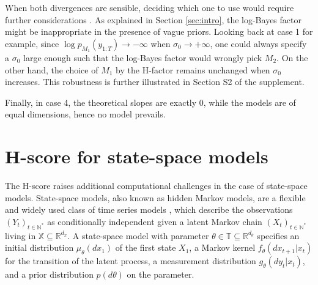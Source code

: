 \documentclass[12pt]{article}
\theoremstyle{plain}
\theoremstyle{definition}
\newcommand{\supphscoreiidNormalrobust}{ S2 }
\begin{document}
	When both divergences are sensible, deciding which one to use would require further considerations \citep[e.g.\! see][]{jewson2018principled}. As explained in Section \ref{sec:intro}, the log-Bayes factor might be inappropriate in the presence of vague priors. Looking back at case 1 for example, since $\log p_{M_1}(y_{1:T})\to -\infty$ when
	$\sigma_0 \to +\infty$, one could always specify a $\sigma_0$ large enough such that the log-Bayes factor would wrongly pick $M_2$. On the other hand, the choice of $M_1$ by the H-factor remains unchanged when $\sigma_0$ increases. This robustness is further illustrated in Section\supphscoreiidNormalrobust of the supplement.
	
	Finally, in case 4, the theoretical slopes are exactly 0, while the models are
	of equal dimensions, hence no model prevails.
	\section{H-score for state-space models}
	\label{sec:hscore_SSM}
	The H-score raises additional computational challenges in the case of state-space models.
	State-space models, also known as hidden Markov models, are a flexible and widely used class of
	time series models \citep{cappe2005,douc:moulines:stoffer2014}, which describe the
	observations $(Y_t)_{t\in\mathbb{N}^*}$ as conditionally
	independent given a latent Markov chain $(X_t)_{t\in\mathbb{N}^*}$ living in $\mathbb{X}\subseteq\mathbb{R}^{d_x}$. A 
	state-space model with parameter
	$\theta\in\mathbb{T}\subseteq\mathbb{R}^{d_\theta}$ specifies an initial
	distribution $\mu_\theta(dx_1)$ of the first state $X_1$, a Markov kernel
	$f_\theta(dx_{t+1}|x_{t})$ for the transition of the latent process, a measurement distribution $g_\theta(dy_t|x_t)$, and a prior distribution
	$p(d\theta)$ on  the parameter. 
\end{document}
